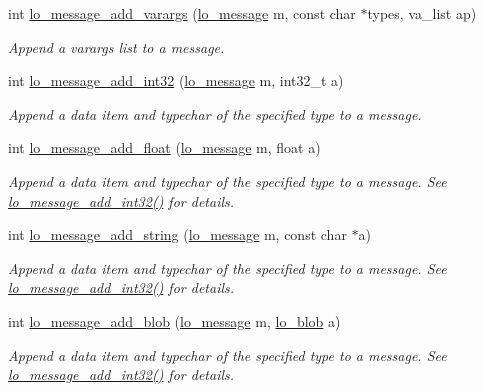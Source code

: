 \begin{DoxyCompactItemize}
int \hyperlink{group__liblolowlevel_ga9cd98b0c6ad5468692fd0b1936bd093f}{lo\+\_\+message\+\_\+add\+\_\+varargs} (\hyperlink{lo__types_8h_ad126083c98d941f00eb72d1690b38d63}{lo\+\_\+message} m, const char $\ast$types, va\+\_\+list ap)
\begin{DoxyCompactList}\small\item\em Append a varargs list to a message. \end{DoxyCompactList}\item 
int \hyperlink{group__liblolowlevel_ga7c9df1bd975a32fb6c8105e6fe327149}{lo\+\_\+message\+\_\+add\+\_\+int32} (\hyperlink{lo__types_8h_ad126083c98d941f00eb72d1690b38d63}{lo\+\_\+message} m, int32\+\_\+t a)
\begin{DoxyCompactList}\small\item\em Append a data item and typechar of the specified type to a message. \end{DoxyCompactList}\item 
int \hyperlink{group__liblolowlevel_ga42815097ea691fd1ec0798beca7f8e5e}{lo\+\_\+message\+\_\+add\+\_\+float} (\hyperlink{lo__types_8h_ad126083c98d941f00eb72d1690b38d63}{lo\+\_\+message} m, float a)
\begin{DoxyCompactList}\small\item\em Append a data item and typechar of the specified type to a message. See \hyperlink{group__liblolowlevel_ga7c9df1bd975a32fb6c8105e6fe327149}{lo\+\_\+message\+\_\+add\+\_\+int32()} for details. \end{DoxyCompactList}\item 
int \hyperlink{group__liblolowlevel_ga4ff414b1b3d87454668dfd728b830888}{lo\+\_\+message\+\_\+add\+\_\+string} (\hyperlink{lo__types_8h_ad126083c98d941f00eb72d1690b38d63}{lo\+\_\+message} m, const char $\ast$a)
\begin{DoxyCompactList}\small\item\em Append a data item and typechar of the specified type to a message. See \hyperlink{group__liblolowlevel_ga7c9df1bd975a32fb6c8105e6fe327149}{lo\+\_\+message\+\_\+add\+\_\+int32()} for details. \end{DoxyCompactList}\item 
int \hyperlink{group__liblolowlevel_gac0ae2fc81d2a48fe63b0803637997fd4}{lo\+\_\+message\+\_\+add\+\_\+blob} (\hyperlink{lo__types_8h_ad126083c98d941f00eb72d1690b38d63}{lo\+\_\+message} m, \hyperlink{lo__types_8h_a8e780f8c09e3e4dd737fe249f11d16fc}{lo\+\_\+blob} a)
\begin{DoxyCompactList}\small\item\em Append a data item and typechar of the specified type to a message. See \hyperlink{group__liblolowlevel_ga7c9df1bd975a32fb6c8105e6fe327149}{lo\+\_\+message\+\_\+add\+\_\+int32()} for details. \end{DoxyCompactList}\item 

\end{DoxyCompactItemize}
